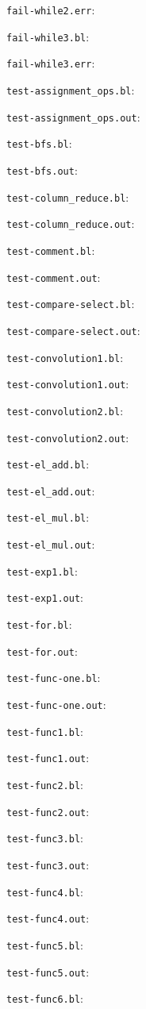 \verb=fail-while2.err=:

\verb=fail-while3.bl=:

\verb=fail-while3.err=:

\verb=test-assignment_ops.bl=:

\verb=test-assignment_ops.out=:

\verb=test-bfs.bl=:

\verb=test-bfs.out=:

\verb=test-column_reduce.bl=:

\verb=test-column_reduce.out=:

\verb=test-comment.bl=:

\verb=test-comment.out=:

\verb=test-compare-select.bl=:

\verb=test-compare-select.out=:

\verb=test-convolution1.bl=:

\verb=test-convolution1.out=:

\verb=test-convolution2.bl=:

\verb=test-convolution2.out=:

\verb=test-el_add.bl=:

\verb=test-el_add.out=:

\verb=test-el_mul.bl=:

\verb=test-el_mul.out=:

\verb=test-exp1.bl=:

\verb=test-exp1.out=:

\verb=test-for.bl=:

\verb=test-for.out=:

\verb=test-func-one.bl=:

\verb=test-func-one.out=:

\verb=test-func1.bl=:

\verb=test-func1.out=:

\verb=test-func2.bl=:

\verb=test-func2.out=:

\verb=test-func3.bl=:

\verb=test-func3.out=:

\verb=test-func4.bl=:

\verb=test-func4.out=:

\verb=test-func5.bl=:

\verb=test-func5.out=:

\verb=test-func6.bl=:

